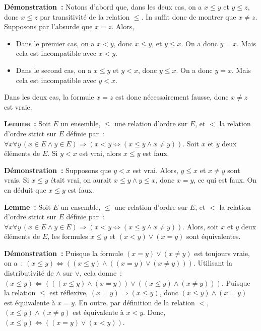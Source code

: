 \noindent\textbf{Démonstration :} Notons d'abord que, dans les deux cas, on a $x \leq y$ et $y \leq z$, donc $x \leq z$ par transitivité de la relation $\leq$. 
    In suffit donc de montrer que $x \neq z$. 
    Supposons par l'absurde que $x = z$. 
    Alors,  
    \begin{itemize}[nosep]
        \item Dans le premier cas, on a $x < y$, donc $x \leq y$, et $y \leq x$. 
            On a donc $y = x$.
            Mais cela est incompatible avec $x < y$.
        \item Dans le second cas, on a $x \leq y$ et $y < x$, donc $y \leq x$.
            On a donc $y = x$.
            Mais cela est incompatible avec $y < x$.
    \end{itemize}
    Dans les deux cas, la formule $x = z$ est donc nécessairement fausse, donc $x \neq z$ est vraie.

   \done 

\medskip

\noindent\textbf{Lemme :} 
    Soit $E$ un ensemble, $\leq$ une relation d'ordre sur $E$, et $<$ la relation d'ordre strict sur $E$ définie par : $\forall x \forall y \, (x \in E \wedge y \in E) \Rightarrow (x < y \Leftrightarrow (x \leq y \wedge x \neq y))$.
    Soit $x$ et $y$ deux éléments de $E$.
    Si $y < x$ est vrai, alors $x \leq y$ est faux.

\medskip

\noindent\textbf{Démonstration :} 
    Supposons que $y < x$ est vrai.
    Alors, $y \leq x$ et $x \neq y$ sont vrais.
    Si $x \leq y$ était vrai, on aurait $x \leq y \wedge y \leq x$, donc $x = y$, ce qui est faux.
    On en déduit que $x \leq y$ est faux.

    \done

\medskip

\noindent\textbf{Lemme :} Soit $E$ un ensemble, $\leq$ une relation d'ordre sur $E$, et $<$ la relation d'ordre strict sur $E$ définie par : $\forall x \forall y \, (x \in E \wedge y \in E) \Rightarrow (x < y \Leftrightarrow (x \leq y \wedge x \neq y))$.
Alors, soit $x$ et $y$ deux éléments de $E$, les formules $x \leq y$ et $(x < y) \vee (x = y)$ sont équivalentes.

\medskip

\noindent\textbf{Démonstration :} 
    Puisque la formule $(x = y) \vee (x \neq y)$ est toujours vraie, on a : $(x \leq y) \Leftrightarrow ((x \leq y) \wedge ((x = y) \vee (x \neq y)))$. 
    Utilisant la distributivité de $\wedge$ sur $\vee$, cela donne : $(x \leq y) \Leftrightarrow (((x \leq y) \wedge (x = y)) \vee ((x \leq y) \wedge (x \neq y)))$.
    Puisque la relation $\leq$ est réflexive, $(x = y) \Rightarrow (x \leq y)$, donc $(x \leq y) \wedge (x = y)$ est équivalente à $x = y$.
    En outre, par définition de la relation $<$, $(x \leq y) \wedge (x \neq y)$ est équivalente à $x < y$. 
    Donc, $(x \leq y) \Leftrightarrow ((x = y) \vee (x < y))$.

